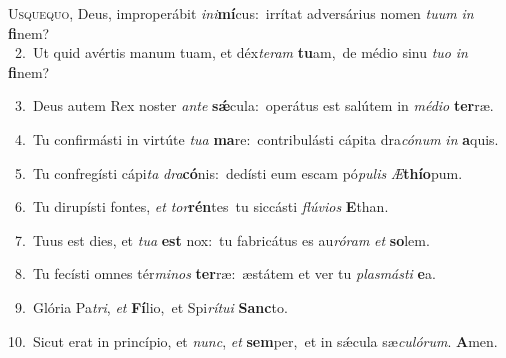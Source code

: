 \lettrine{\initial\textcolor{\initialcolor}{U}}{squequo,} Deus, improperábit \textit{in}\-\textit{i}\textbf{mí}cus:~\star irrítat adversárius nomen \textit{tu}\-\textit{um} \textit{in} \textbf{fi}\-nem?\\
{\numbfont\textcolor{\numbcolor}{~2.}}~Ut quid avértis manum tuam, et déx\-\textit{te}\-\textit{ram} \textbf{tu}\-am,~\star de médio sinu \textit{tu}\-\textit{o} \textit{in} \textbf{fi}\-nem?\par
{\numbfont\textcolor{\numbcolor}{~3.}}~Deus autem Rex noster \textit{an}\-\textit{te} \textbf{sǽ}\-cula:~\star operátus est salútem in \textit{mé}\-\textit{di}\textit{o} \textbf{ter}\-ræ.\par
{\numbfont\textcolor{\numbcolor}{~4.}}~Tu confirmásti in virtúte \textit{tu}\-\textit{a} \textbf{ma}\-re:~\star contribulásti cápita dra\-\textit{có}\-\textit{num} \textit{in} \textbf{a}\-quis.\par
{\numbfont\textcolor{\numbcolor}{~5.}}~Tu confregísti cápi\textit{ta} \textit{dra}\-\textbf{có}nis:~\star dedísti eum escam pó\-\textit{pu}\-\textit{lis} \textit{Æ}\-\textbf{thí}\textbf{o}pum.\par
{\numbfont\textcolor{\numbcolor}{~6.}}~Tu dirupísti fontes, \textit{et} \textit{tor}\-\textbf{rén}tes~\star tu siccásti \textit{flú}\-\textit{vi}\textit{os} \textbf{E}\-than.\par
{\numbfont\textcolor{\numbcolor}{~7.}}~Tuus est dies, et \textit{tu}\-\textit{a} \textbf{est} nox:~\star tu fabricátus es au\-\textit{ró}\-\textit{ram} \textit{et} \textbf{so}\-lem.\par
{\numbfont\textcolor{\numbcolor}{~8.}}~Tu fecísti omnes tér\-\textit{mi}\-\textit{nos} \textbf{ter}\-ræ:~\star æstátem et ver tu \textit{plas}\-\textit{más}\textit{ti} \textbf{e}\-a.\par
{\numbfont\textcolor{\numbcolor}{~9.}}~Glória Pa\-\textit{tri}\-, \textit{et} \textbf{Fí}\-lio,~\star et Spi\-\textit{rí}\-\textit{tu}\textit{i} \textbf{Sanc}\-to.\par
{\numbfont\textcolor{\numbcolor}{10.}}~Sicut erat in princípio, et \textit{nunc}\-, \textit{et} \textbf{sem}\-per,~\star et in sǽcula sæ\-\textit{cu}\-\textit{ló}\textit{rum}. \textbf{A}\-men.\par
